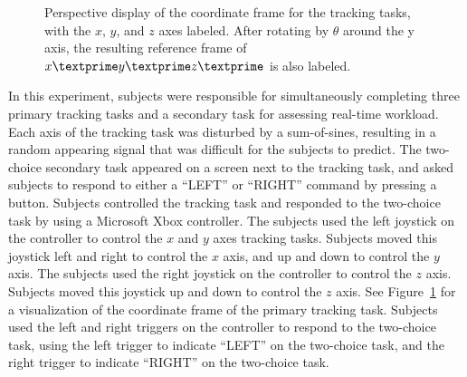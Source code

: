 \begin{figure}[b!]
\begin{center}

        \caption[Perspective display of the coordinate frame for the tracking tasks]{Perspective display of the coordinate frame for the tracking tasks, with the $x$, $y$, and $z$ axes labeled. After rotating by $\theta$ around the y axis, the resulting reference frame of $x\textprime y\textprime z\textprime$ is also labeled.}
        \label{designdiagram}
    \end{center}
\end{figure}

In this experiment, subjects were responsible for simultaneously completing three primary tracking tasks and a secondary task for assessing real-time workload.
Each axis of the tracking task was disturbed by a sum-of-sines, resulting in a random appearing signal that was difficult for the subjects to predict.
The two-choice secondary task appeared on a screen next to the tracking task, and asked subjects to respond to either a ``LEFT'' or ``RIGHT'' command by pressing a button.
Subjects controlled the tracking task and responded to the two-choice task by using a Microsoft Xbox controller.
The subjects used the left joystick on the controller to control the $x$ and $y$ axes tracking tasks.
Subjects moved this joystick left and right to control the $x$ axis, and up and down to control the $y$ axis.
The subjects used the right joystick on the controller to control the $z$ axis.
Subjects moved this joystick up and down to control the $z$ axis.
See Figure~\ref{designdiagram} for a visualization of the coordinate frame of the primary tracking task.
Subjects used the left and right triggers on the controller to respond to the two-choice task, using the left trigger to indicate ``LEFT'' on the two-choice task, and the right trigger to indicate ``RIGHT'' on the two-choice task.

